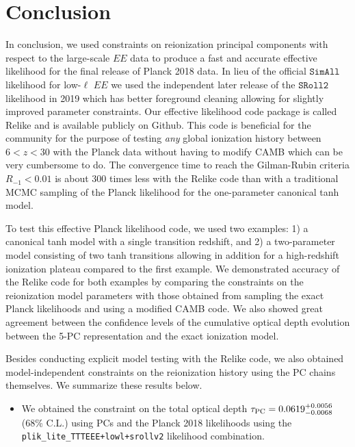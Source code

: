 \documentclass[prd,twocolumn,amsmath,amssymb,floatfix,superscriptaddress,nofootinbib]{revtex4-1}
\begin{document}
{\section{Conclusion}
\label{sec:conclusion}

In conclusion, we used constraints on reionization principal components with respect to the large-scale $EE$ data to produce a fast and accurate effective likelihood for the final release of Planck 2018 data. In lieu of the official $\texttt{SimAll}$ likelihood for low-$\ell$ $EE$ we used the independent later release of the $\texttt{SRoll2}$ likelihood in 2019 which has better foreground cleaning allowing for slightly improved parameter constraints. Our effective likelihood code package is called Relike and is available publicly on Github. This code is beneficial for the community for the purpose of testing \textit{any} global ionization history between $6 < z < 30$ with the Planck data without having to modify CAMB which can be very cumbersome to do. The convergence time to reach the Gilman-Rubin criteria $R_{-1} < 0.01$ is about 300 times less with the Relike code than with a traditional MCMC sampling of the Planck likelihood for the one-parameter canonical tanh model. 

To test this effective Planck likelihood code, we used two examples: 1) a canonical tanh model with a single transition redshift, and 2) a two-parameter model consisting of two tanh transitions allowing in addition for a high-redshift ionization plateau compared to the first example. We demonstrated accuracy of the Relike code for both examples by comparing the constraints on the reionization model parameters with those obtained from sampling the exact Planck likelihoods and using a modified CAMB code. We also showed great agreement between the confidence levels of the cumulative optical depth evolution between the 5-PC representation and the exact ionization model.

Besides conducting explicit model testing with the Relike code, we also obtained model-independent constraints on the reionization history using the PC chains themselves. We summarize these results below.

\begin{itemize}

    \item {We obtained the constraint on the total optical depth $\tau_{\rm PC} = 0.0619^{+0.0056}_{-0.0068}$ (68\% C.L.) 
    using PCs and the Planck 2018 likelihoods using the \texttt{plik\_lite\_TTTEEE+lowl+srollv2} likelihood combination.}
    

\end{itemize}}
\end{document}
